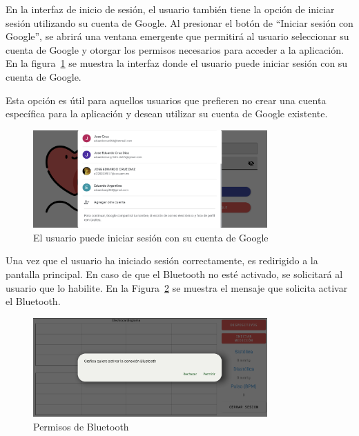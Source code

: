     En la interfaz de inicio de sesión, el usuario también tiene la opción de iniciar sesión utilizando su cuenta de Google. Al presionar el botón de ``Iniciar sesión con Google'', se abrirá una ventana emergente que permitirá al usuario seleccionar su cuenta de Google y otorgar los permisos necesarios para acceder a la aplicación. En la figura~\ref{fig:Android_IniciarSesionGoogle} se muestra la interfaz donde el usuario puede iniciar sesión con su cuenta de Google.

    Esta opción es útil para aquellos usuarios que prefieren no crear una cuenta específica para la aplicación y desean utilizar su cuenta de Google existente.

    \begin{figure}[H]
        \centering
        \includegraphics[width=0.8\textwidth]{img/Resultados/android_iniciarSesionGoogle.png}
        \caption[El usuario puede iniciar sesión con su cuenta de Google.]{El usuario puede iniciar sesión con su cuenta de Google\footnotemark}
        \label{fig:Android_IniciarSesionGoogle}
    \end{figure}

    Una vez que el usuario ha iniciado sesión correctamente, es redirigido a la pantalla principal. En caso de que el Bluetooth no esté activado, se solicitará al usuario que lo habilite. En la Figura~\ref{fig:Android_PermisosBT} se muestra el mensaje que solicita activar el Bluetooth.

    \begin{figure}[H]
        \centering
        \includegraphics[width=0.8\textwidth]{img/Resultados/android_permisosBT.png}
        \caption[Permisos de Bluetooth.]{Permisos de Bluetooth\footnotemark}
        \label{fig:Android_PermisosBT}
    \end{figure}

